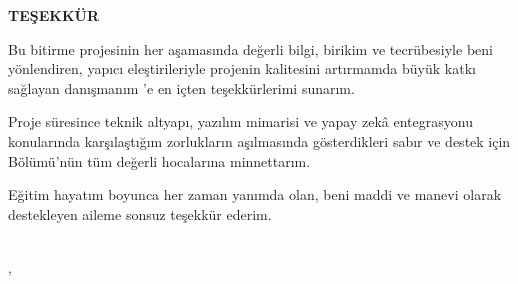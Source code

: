 \clearpage
\thispagestyle{empty}

\begin{center}
{\Large \textbf{TEŞEKKÜR}}
\end{center}

\vspace{1cm}

Bu bitirme projesinin her aşamasında değerli bilgi, birikim ve tecrübesiyle beni yönlendiren, yapıcı eleştirileriyle projenin kalitesini artırmamda büyük katkı sağlayan danışmanım \textbf{\supname}'e en içten teşekkürlerimi sunarım.

Proje süresince teknik altyapı, yazılım mimarisi ve yapay zekâ entegrasyonu konularında karşılaştığım zorlukların aşılmasında gösterdikleri sabır ve destek için \university{} \dept{} Bölümü'nün tüm değerli hocalarına minnettarım.

Eğitim hayatım boyunca her zaman yanımda olan, beni maddi ve manevi olarak destekleyen aileme sonsuz teşekkür ederim.

\vspace{1cm}
\begin{flushright}
\authorname\\
\univcity, \degreedate
\end{flushright}
